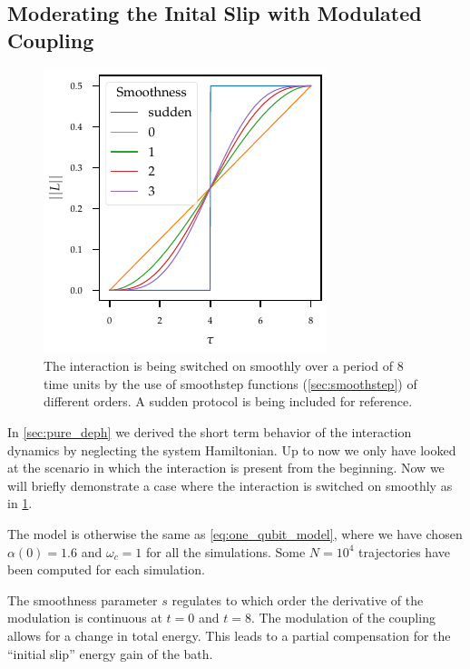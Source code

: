 \subsection{Moderating the Inital Slip with Modulated Coupling}%
\label{sec:moder-init-slip}
\begin{figure}[htp]
  \centering
  \includegraphics{figs/one_bath_mod/modulation_protocols_init.pdf}
  \caption{\label{fig:L_mod_init} The interaction is being switched on
    smoothly over a period of \(8\) time units by the use of
    smoothstep functions (\cref{sec:smoothstep}) of different
    orders. A sudden protocol is being included for reference.}
\end{figure}
In \cref{sec:pure_deph} we derived the short term behavior of the
interaction dynamics by neglecting the system Hamiltonian. Up to now
we only have looked at the scenario in which the interaction is
present from the beginning. Now we will briefly demonstrate a case
where the interaction is switched on smoothly as in
\cref{fig:L_mod_init}.

The model is otherwise the same as \cref{eq:one_qubit_model}, where we
have chosen \(α(0)=1.6\) and \(ω_{c}=1\) for all the simulations. Some
\(N=10^{4}\) trajectories have been computed for each simulation.

The smoothness parameter \(s\) regulates to which order the derivative
of the modulation is continuous at \(t=0\) and \(t=8\). The modulation
of the coupling allows for a change in total energy. This leads to a
partial compensation for the ``initial slip'' energy gain of the bath.


